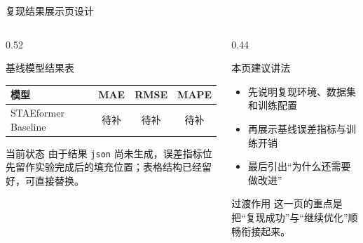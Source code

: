 \documentclass[10pt,aspectratio=169]{ctexbeamer}
\begin{document}
\begin{frame}{复现结果展示页设计}
  \begin{columns}[T]
    \begin{column}{0.52\textwidth}
      \begin{block}{基线模型结果表}
        \begin{table}
          \centering
          \scriptsize
          \renewcommand{\arraystretch}{1.15}
          \begin{tabular}{lccc}
            \toprule
            \textbf{模型} & \textbf{MAE} & \textbf{RMSE} & \textbf{MAPE} \\
            \midrule
            STAEformer Baseline & 待补 & 待补 & 待补 \\
            \bottomrule
          \end{tabular}
        \end{table}
      \end{block}

      \begin{exampleblock}{当前状态}
        由于结果 \texttt{json} 尚未生成，误差指标位先留作实验完成后的填充位置；表格结构已经留好，可直接替换。
      \end{exampleblock}
    \end{column}
    \begin{column}{0.44\textwidth}
      \begin{block}{本页建议讲法}
        \begin{itemize}\setlength{\itemsep}{2pt}
          \item 先说明复现环境、数据集和训练配置
          \item 再展示基线误差指标与训练开销
          \item 最后引出“为什么还需要做改进”
        \end{itemize}
      \end{block}

      \begin{alertblock}{过渡作用}
        这一页的重点是把“复现成功”与“继续优化”顺畅衔接起来。
      \end{alertblock}
    \end{column}
  \end{columns}
\end{frame}
\end{document}
